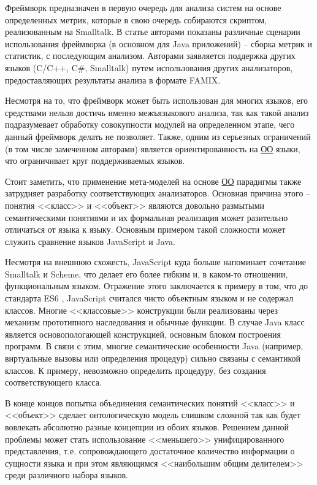 Фреймворк предназначен в первую очередь для анализа систем на основе определенных метрик,
которые в свою очередь собираются скриптом, реализованным на Smalltalk. В статье авторами показаны
различные сценарии использования фреймворка (в основном для Java приложений) -- сборка метрик и статистик,
с последующим анализом. Авторами заявляется поддержка других языков (C/C++, C\#, Smalltalk) путем использования других анализаторов,
предоставляющих результаты анализа в формате FAMIX.

Несмотря на то, что фреймворк может быть использован для многих языков, его средствами нельзя достичь именно
межъязыкового анализа, так как такой анализ подразумевает обработку совокупности модулей на определенном этапе, чего
данный фреймворк делать не позволяет. Также, одним из серьезных ограничений (в том числе замеченном авторами) является
ориентированность на \hyperlink{ОО}{ОО} языки, что ограничивает круг поддерживаемых языков.

Стоит заметить, что применение мета-моделей на основе \hyperlink{ОО}{ОО} парадигмы также затрудняет
разработку соответствующих анализаторов. Основная причина этого -- понятия <<класс>> и <<объект>> являются довольно
размытыми семантическими понятиями и их формальная реализация может разительно отличаться от языка к языку.
Основным примером такой сложности может служить сравнение языков JavaScript и Java. 

Несмотря на внешнюю схожесть, JavaScript куда больше напоминает сочетание Smalltalk и Scheme, что делает его более гибким
и, в каком-то отношении, функциональным языком. Отражение этого заключается к примеру в том, что до 
стандарта ES6 \cite{ecma262}, JavaScript считался чисто объектным языком и не содержал классов. Многие
<<классовые>> конструкции были реализованы через механизм прототипного наследования и обычные функции.
В случае Java класс является основопологающей конструкцией, основным блоком построения программ. В связи
с этим, многие семантические особенности Java (например, виртуальные вызовы или определения процедур) сильно
связаны с семантикой классов. К примеру, невозможно определить процедуру, без создания соответствующего класса.

В конце концов попытка объединения семантических понятий <<класс>> и <<объект>> сделает онтологическую модель
слишком сложной так как будет вовлекать абсолютно разные концепции из обоих языков. Решением данной проблемы
может стать использование <<меньшего>> унифицированного представления, т.е. сопровождающего
достаточное количество информации о сущности языка и при этом являющимся <<наибольшим общим делителем>>
среди различного набора языков.

